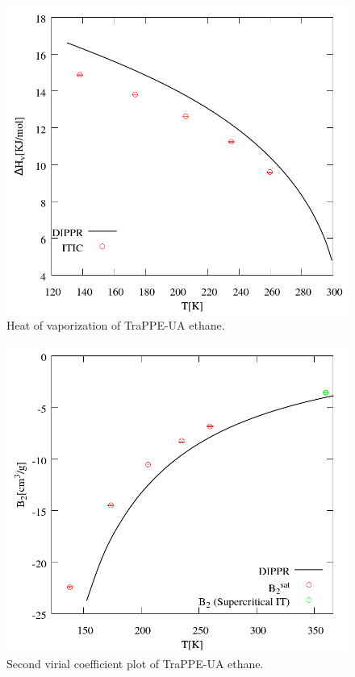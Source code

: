 \documentclass[%
 aip,
 jcp,
 sd,%
 amsmath,amssymb,
]{revtex4-1}
\begin{document}
\begin{figure}[!htbp]
\includegraphics[scale=0.35]{Figures/EXAMPLE-SIM_TraPPE-C2_hvap.png}
\caption{Heat of vaporization of TraPPE-UA ethane.}
\label{fig:EXAMPLE-SIM/TraPPE-C2/hvap}
\end{figure}

\begin{figure}[!htbp]
\includegraphics[scale=0.35]{Figures/EXAMPLE-SIM_TraPPE-C2_b2.png}
\caption{Second virial coefficient plot of TraPPE-UA ethane.}
\label{fig:EXAMPLE-SIM/TraPPE-C2/b2}
\end{figure}
\end{document}
